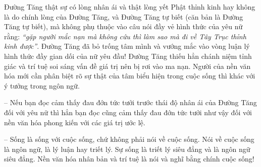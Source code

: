 Đường Tăng thật sự có lòng nhân ái và thật lòng yết Phật thỉnh kinh hay không là do chính lòng của Đường Tăng, và Đường Tăng tự biết (căn bản là Đường Tăng tự biết), mà không phụ thuộc vào câu nói đầy vẻ hình thức của yêu nữ rằng: \emph{``gặp người mắc nạn mà không cứu thì làm sao mà đi về Tây Trục thỉnh kinh được''}. Đường Tăng đã bỏ trống tâm mình và vướng mắc vào vòng luận lý hình thức đầy gian dối của nữ yêu đầu! Đường Tăng thiếu hẳn chánh niệm tỉnh giác và trí tuệ soi sáng vấn đề giá trị nên bị rơi vào ma nạn. Người của nền văn hóa mới cần phân biệt rõ sự thật của tâm biểu hiện trong cuộc sống thì khác với ý tưởng trong ngôn ngữ.

-- Nếu bạn đọc cảm thấy đau đớn tức tưởi trước thái độ nhân ái của Đường Tăng đối với yêu nữ thì hẳn bạn đọc cũng cảm thấy đau đớn tức tưởi như vậy đối với nền văn hóa phong kiến với các giá trị ước lệ.

-- Sống là sống với cuộc sống, chứ không phải nói về cuộc sống. Nói về cuộc sống là ngôn ngữ, là lý luận hay triết lý. Sự sống là triết lý siêu đẳng và là ngôn ngữ siêu đẳng. Nền văn hóa nhân bản và trí tuệ là nói và nghĩ bằng chính cuộc sống!
